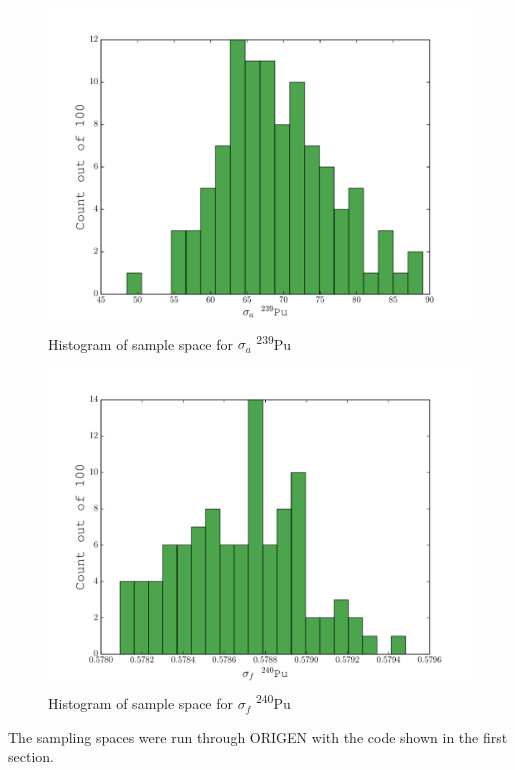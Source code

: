 \documentclass[11pt,notitlepage]{article}
\newcommand{\tss}{\textsuperscript}
\begin{document}
\begin{todolist}
  \begin{figure}[H]
    \begin{center}
      \includegraphics[width=0.77\columnwidth]{../Origen2/94Pu239aHIST.pdf}
      \vspace{-5mm}
      \caption{Histogram of sample space for $\sigma_a$ \tss{239}Pu}
      \label{fig:SPu239a}
    \end{center}
  \end{figure}

  \begin{figure}[H]
    \begin{center}
      \includegraphics[width=0.77\columnwidth]{../Origen2/94Pu240fHIST.pdf}
      \vspace{-5mm}
      \caption{Histogram of sample space for $\sigma_f$ \tss{240}Pu}
      \label{fig:SPu240f}
    \end{center}
  \end{figure}


  The sampling spaces were run through ORIGEN with the code
  shown in the first section.
  

\end{todolist}
\end{document}
